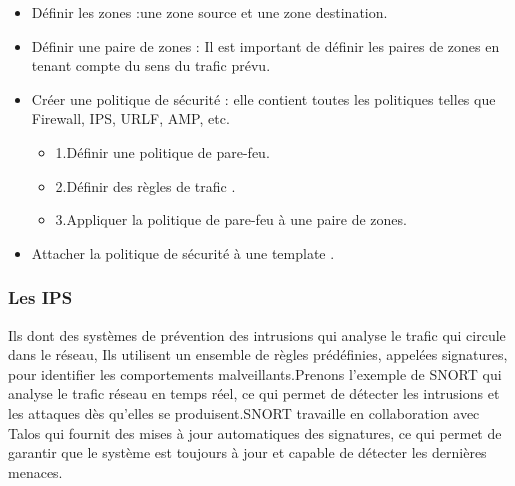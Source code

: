 \begin{itemize}
	\item{ Définir les zones :une zone source et une zone destination.} 
\end{itemize}
\begin{itemize}
	\item{ Définir une paire de zones : Il est important de définir les paires de zones en tenant compte du sens du trafic prévu.} 
\end{itemize}
\begin{itemize}
	\item{ Créer une politique de sécurité : elle contient toutes les politiques telles que Firewall, IPS, URLF, AMP, etc.}
	\begin{itemize}
		\item{1.Définir une politique de pare-feu.} 
	\end{itemize}
	\begin{itemize}
		\item{ 2.Définir des règles de trafic .} 
	\end{itemize}
	\begin{itemize}
		\item{3.Appliquer la politique de pare-feu à une paire de zones.} 
	\end{itemize}
	
	
\end{itemize}
\begin{itemize}
	\item{ Attacher la politique de sécurité à une template .} 
\end{itemize}

\subsubsection{Les IPS }

Ils dont des systèmes de prévention des intrusions qui analyse le trafic qui circule dans le réseau, Ils utilisent un ensemble de règles prédéfinies, appelées signatures, pour identifier les comportements malveillants.Prenons l’exemple de SNORT qui analyse le trafic réseau en temps réel, ce qui permet de détecter les intrusions et les attaques dès qu'elles se produisent.SNORT travaille en collaboration avec Talos qui fournit des mises à jour automatiques des signatures, ce qui permet de garantir que le système est toujours à jour et capable de détecter les dernières menaces.


